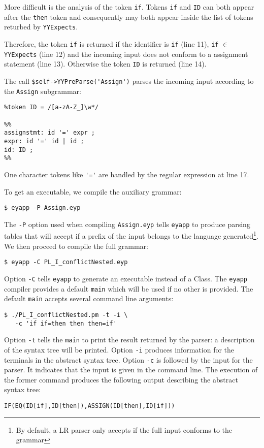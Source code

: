 More difficult is the analysis of the token \verb|if|.
Tokens \verb|if| and \verb|ID| can both appear after 
the \verb|then| token and consequently may both
appear inside the list of tokens returbed by \verb|YYExpects|.

Therefore, the token \verb|if| is returned
if the identifier is \verb|if| (line 11), 
\verb|if| $\in$ \verb|YYExpects| (line 12)
and the incoming input does not conform to a
assignment statement (line 13). 
Otherwise
the token \verb|ID| is returned (line 14).

The call \verb|$self->YYPreParse('Assign')|
parses the incoming input according to the 
\verb|Assign| subgrammar:

\begin{verbatim}
%token ID = /[a-zA-Z_]\w*/

%%
assignstmt: id '=' expr ;
expr: id '=' id | id ;
id: ID ;
%%
\end{verbatim}

One character tokens like \verb|'='| are handled by
the regular expression at line 17.

To get an executable, we compile the auxiliary grammar:

\begin{verbatim}
$ eyapp -P Assign.eyp
\end{verbatim}
The \verb|-P| option used when compiling \verb|Assign.eyp|
tells \verb|eyapp| to produce parsing tables that will accept 
if a prefix of the input belongs to the language generated\footnote{By default, a LR parser only accepts if the full input conforms 
to the grammar}.
We then proceed to compile the full grammar:
\begin{verbatim}
$ eyapp -C PL_I_conflictNested.eyp
\end{verbatim}

Option \verb|-C| tells \verb|eyapp| to
generate an executable instead of a Class. 
The \verb|eyapp| compiler provides a default \verb|main|
which will be used if no other is provided.
The default \verb|main| accepts several command line arguments:

\begin{verbatim}
$ ./PL_I_conflictNested.pm -t -i \
   -c 'if if=then then then=if'
\end{verbatim}
Option \verb|-t| tells the \verb|main| to print the result returned by the parser:
a  description of the syntax tree will be printed. Option \verb|-i| produces
information for the terminals in the abstract syntax tree.
Option \verb|-c| is followed by the input
for the parser. It indicates that the input is given in the command line.
The execution of the former command produces the following output describing
the abstract syntax tree:
\begin{verbatim}
IF(EQ(ID[if],ID[then]),ASSIGN(ID[then],ID[if]))
\end{verbatim}

